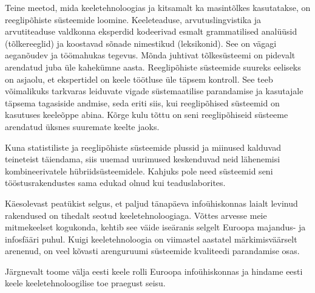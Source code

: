 \documentclass[]{../metanetpaper}
\begin{document}
\begin{multicols}{2}
Teine meetod, mida keeletehnoloogias ja kitsamalt ka masintõlkes kasutatakse, on reeglipõhiste süsteemide loomine. 
Keele\-tea\-duse, arvutuslingvistika ja arvutitea\-duse valdkonna eksperdid kodeerivad esmalt grammatilised analüüsid (tõlke\-reeg\-lid) ja koostavad sõnade nimestikud (leksikonid). 
See on vägagi aeganõudev ja töömahukas tegevus. 
Mõnda juhtivat tõlkesüsteemi on pidevalt arendatud juba üle kahekümne aasta. 
Reeglipõhiste süsteemide suureks eeliseks on asjaolu, et ekspertidel on keele töötluse üle täpsem kontroll. 
See teeb võimalikuks tarkvaras leiduvate vigade süstemaatilise parandamise ja kasutajale täpsema tagasiside andmise, seda eriti siis, kui reeglipõhised süsteemid on kasutuses keeleõppe abina. 
Kõrge kulu tõttu on seni reeglipõhiseid süsteeme arendatud üksnes suuremate keelte jaoks.



Kuna statistiliste ja reeglipõhiste süsteemide plussid ja miinused kalduvad teineteist täiendama, siis uuemad uurimused keskenduvad neid lähenemisi kombineerivatele hübriidsüsteemidele. 
Kahjuks pole need süsteemid seni tööstusrakendustes sama edukad olnud kui teaduslaborites.

Käesolevast peatükist selgus, et paljud tänapäeva infoühiskonnas laialt levinud rakendused on tihedalt seotud keeletehnoloogiaga. 
Võttes arvesse meie mitmekeelset kogukonda, kehtib see väide iseäranis selgelt Euroopa majandus- ja infosfääri puhul. 
Kuigi keeletehnoloogia on viimastel aastatel märkimisväärselt arenenud, on veel kõvasti arenguruumi süsteemide kvaliteedi parandamise osas.

Järgnevalt toome välja eesti keele rolli Euroopa infoühiskonnas ja hindame eesti keele keeletehnoloogilise toe praegust seisu.
\end{multicols}

\clearpage


\end{document}
